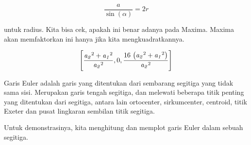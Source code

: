 \documentclass{article}
\begin{document}
\begin{eulernotebook}
\begin{eulercomment}
\begin{eulercomment}
\begin{eulercomment}
\begin{eulercomment}
\begin{eulercomment}
\end{eulercomment}
\begin{eulerformula}
\[
\frac{a}{\sin(\alpha)}=2r
\]
\end{eulerformula}
\begin{eulercomment}
untuk radius. Kita bisa cek, apakah ini benar adanya pada Maxima.
Maxima akan memfaktorkan ini hanya jika kita mengkuadratkannya.
\end{eulercomment}
\begin{eulerformula}
\[
\left[ \frac{{\it a_2}^2+{\it a_1}^2}{{\it a_2}^2} , 0 , \frac{16\,
 \left({\it a_2}^2+{\it a_1}^2\right)}{{\it a_2}^2} \right] 
\]
\end{eulerformula}
\begin{eulercomment}
Garis Euler adalah garis yang ditentukan dari sembarang segitiga yang
tidak sama sisi. Merupakan garis tengah segitiga, dan melewati
beberapa titik penting yang ditentukan dari segitiga, antara lain
ortocenter, sirkumcenter, centroid, titik Exeter dan pusat lingkaran
sembilan titik segitiga.

Untuk demonstrasinya, kita menghitung dan memplot garis Euler dalam
sebuah segitiga.


\end{eulercomment}
\end{eulercomment}
\end{eulercomment}
\end{eulercomment}
\end{eulercomment}
\end{eulernotebook}
\end{document}
